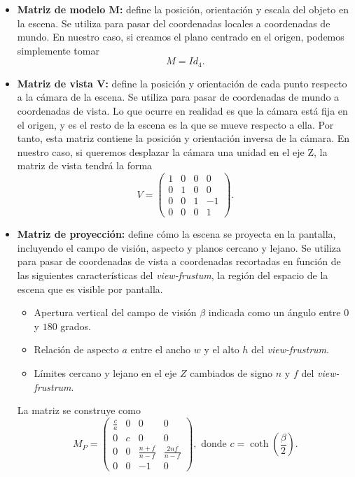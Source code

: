 \begin{itemize}
    \item \textbf{Matriz de modelo $\boldsymbol{M}$:} define la posición, orientación y escala del objeto en la escena. Se utiliza para pasar del coordenadas locales a coordenadas de mundo. En nuestro caso, si creamos el plano centrado en el origen, podemos simplemente tomar
    \begin{equation*}
        M = Id_{4}.
    \end{equation*}
    \item \textbf{Matriz de vista  $\boldsymbol{V}$:} define la posición y orientación de cada punto respecto a la cámara de la escena. Se utiliza para pasar de coordenadas de mundo a coordenadas de vista. Lo que ocurre en realidad es que la cámara está fija en el origen, y es el resto de la escena es la que se mueve respecto a ella. Por tanto, esta matriz contiene la posición y orientación inversa de la cámara. En nuestro caso, si queremos desplazar la cámara una unidad en el eje Z, la matriz de vista tendrá la forma
    \begin{equation*}
        V = \begin{pmatrix}
        1 & 0 & 0 & 0\\
        0 & 1 & 0 & 0\\
        0 & 0 & 1 & -1\\
        0 & 0 & 0 & 1
        \end{pmatrix}.
    \end{equation*}
    
    \item \textbf{Matriz de proyección:} define cómo la escena se proyecta en la pantalla, incluyendo el campo de visión, aspecto y planos cercano y lejano. Se utiliza para pasar de coordenadas de vista a coordenadas recortadas en función de las siguientes características del \textit{view-frustum}, la región del espacio de la escena que es visible por pantalla.
    \begin{itemize}
        \item Apertura vertical del campo de visión $\beta$ indicada como un ángulo entre $0$ y $180$ grados.
        \item Relación de aspecto $a$ entre el ancho $w$ y el alto $h$ del \textit{view-frustrum}.
        \item Límites cercano y lejano en el eje $Z$ cambiados de signo $n$ y $f$ del \textit{view-frustrum}.
    \end{itemize}
    La matriz se construye como
    \begin{equation*}
        M_P = \begin{pmatrix}
        \frac{c}{a} & 0 & 0 & 0\\
        0 & c & 0 & 0\\
        0 & 0 & \frac{n+f}{n-f} & \frac{2nf}{n-f}\\
        0 & 0 & -1 & 0
        \end{pmatrix}, \text{ donde } c = \coth\left({\frac{\beta}{2}}\right).
    \end{equation*}


\end{itemize}
